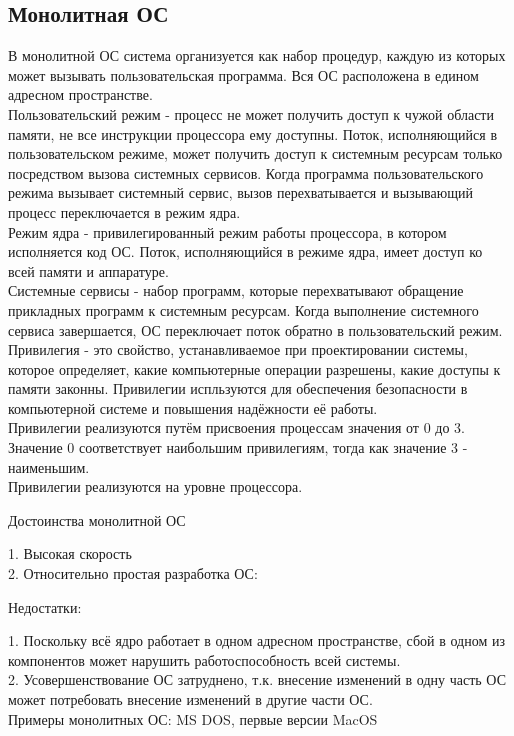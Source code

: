 \documentclass[a4paper]{article}
\begin{document}
\subsection{Монолитная ОС}%
\setcounter{subsection}{1}
В монолитной ОС система организуется как набор процедур, каждую из которых может вызывать пользовательская программа. Вся ОС расположена в едином адресном пространстве. \\
Пользовательский режим - процесс не может получить доступ к чужой области памяти, не все инструкции процессора ему доступны. Поток, исполняющийся в пользовательском режиме, может получить доступ к системным ресурсам только посредством вызова системных сервисов. Когда программа пользовательского режима вызывает системный сервис, вызов перехватывается и вызывающий процесс переключается в режим ядра.\\
Режим ядра - привилегированный режим работы процессора, в котором исполняется код ОС. Поток, исполняющийся в режиме ядра, имеет доступ ко всей памяти и аппаратуре.\\
Системные сервисы - набор программ, которые перехватывают обращение прикладных программ к системным ресурсам. Когда выполнение системного сервиса завершается, ОС переключает поток обратно в пользовательский режим.\\
Привилегия - это свойство, устанавливаемое при проектировании системы, которое определяет, какие компьютерные операции разрешены, какие доступы к памяти законны. Привилегии испльзуются для обеспечения безопасности в компьютерной системе и повышения надёжности её работы.\\
Привилегии реализуются путём присвоения процессам значения от 0 до 3. Значение 0 соответствует наибольшим привилегиям, тогда как значение 3 - наименьшим.\\
Привилегии реализуются на уровне процессора.\\
\begin{center}
Достоинства монолитной ОС
\end{center}
1. Высокая скорость\\
2. Относительно простая разработка ОС:\\
\begin{center}
Недостатки:
\end{center}
1. Поскольку всё ядро работает в одном адресном пространстве, сбой в одном из компонентов может нарушить работоспособность всей системы.\\
2. Усовершенствование ОС затруднено, т.к. внесение изменений в одну часть ОС может потребовать внесение изменений в другие части ОС.\\
Примеры монолитных ОС: MS DOS, первые версии MacOS\\
\end{document}

